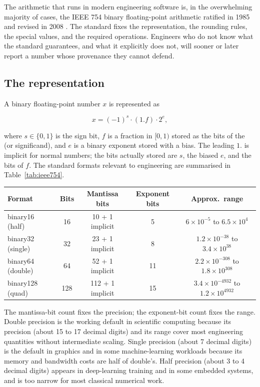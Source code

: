 The arithmetic that runs in modern engineering software is, in the
overwhelming majority of cases, the IEEE 754 binary floating-point
arithmetic ratified in 1985 and revised in 2008
\cite[ch.~2]{text:higham-numerical}. The standard fixes the
representation, the rounding rules, the special values, and the
required operations. Engineers who do not know what the standard
guarantees, and what it explicitly does not, will sooner or later
report a number whose provenance they cannot defend.

\subsection{The representation}

A binary floating-point number $x$ is represented as

\[
x = (-1)^{s} \cdot (1.f) \cdot 2^{e},
\]

where $s \in \{0, 1\}$ is the sign bit, $f$ is a fraction in $[0, 1)$
stored as the bits of the  (or significand), and
$e$ is a binary exponent stored with a bias. The leading $1.$ is
implicit for normal numbers; the bits actually stored are $s$, the
biased $e$, and the bits of $f$. The standard formats relevant to
engineering are summarised in Table~\ref{tab:ieee754}.

\begin{center}
\begin{tabular}{lcccc}
\hline
Format & Bits & Mantissa bits & Exponent bits & Approx.~range \\
\hline
binary16 (half) & 16 & 10 + 1 implicit & 5 & $6\times 10^{-5}$ to $6.5\times 10^{4}$ \\
binary32 (single) & 32 & 23 + 1 implicit & 8 & $1.2\times 10^{-38}$ to $3.4\times 10^{38}$ \\
binary64 (double) & 64 & 52 + 1 implicit & 11 & $2.2\times 10^{-308}$ to $1.8\times 10^{308}$ \\
binary128 (quad) & 128 & 112 + 1 implicit & 15 & $3.4\times 10^{-4932}$ to $1.2\times 10^{4932}$ \\
\hline
\end{tabular}
\end{center}
\label{tab:ieee754}

The mantissa-bit count fixes the precision; the exponent-bit count
fixes the range. Double precision is the working default in
scientific computing because its precision (about 15 to 17 decimal
digits) and its range cover most engineering quantities without
intermediate scaling. Single precision (about 7 decimal digits) is
the default in graphics and in some machine-learning workloads
because its memory and bandwidth costs are half of double's. Half
precision (about 3 to 4 decimal digits) appears in deep-learning
training and in some embedded systems, and is too narrow for most
classical numerical work.

